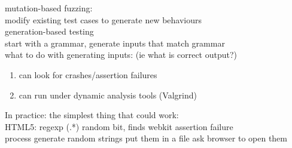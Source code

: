 \documentclass[10pt,usletter]{article}
\newcommand{\tab}[1][1cm]{\hspace*{#1}}
\begin{document}
mutation-based fuzzing:\\
\tab modify existing test cases to generate new behaviours\\
generation-based testing\\
\tab start with a grammar, generate inputs that match grammar\\
what to do with generating inputs: (ie what is correct output?)
\begin{enumerate}
\item can look for crashes/assertion failures\\
\item can run under dynamic analysis tools (Valgrind)
\end{enumerate}
In practice: the simplest thing that could work:\\
HTML5: regexp (.*) random bit, finds webkit assertion failure\\
process generate random strings put them in a file ask browser to open them\\
\end{document}

